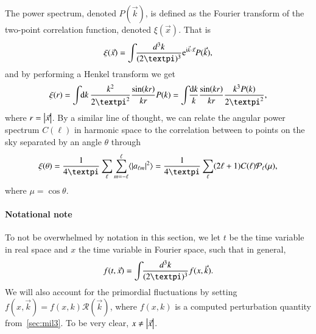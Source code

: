




The power spectrum, denoted $P(\vec{k})$, is defined as the Fourier transform of the two-point correlation function, denoted $\xi(\vec{x})$. That is
\begin{equation}
    \xi(\vec{x}) = \int \dkkk  \eu[\im \vec{k}\cdot \vec{x}] P(\vec{k}),
\end{equation}
and by performing a Henkel transform we get
\begin{equation}
    \xi(r) = \int\dx{k}\frac{k^2}{2\pi^2} \frac{\sin(kr)}{kr} P(k) = \int\!\!\frac{\diff k}{k} \frac{\sin(kr)}{kr} \frac{k^3P(k)}{2\pi^2},
\end{equation}
where $r=\abs{\vec{x}}$. By a similar line of thought, we can relate the angular power spectrum $C(\ell)$ in harmonic space to the correlation between to points on the sky separated by an angle $\theta$ through
\begin{equation}
    \xi(\theta) =\frac{1}{4\pi}  \sum_{\ell} \sum_{m= -\ell}^{\ell} \avg{\abs{a\ellm}^2}=\frac{1}{4\pi} \sum_{\ell} (2\ell + 1) C(\ell)\mathcal{P}_\ell(\mu),
\end{equation}
where $\mu = \cos{\theta}$.


\paragraph{Notational note} 
To not be overwhelmed by notation in this section, we let $t$ be the time variable in real space and $x$ the time variable in Fourier space, such that in general,
\begin{equation}
    f(t, \vec{x}) = \int \dkkk f(x, \vec{k}).
\end{equation}
We will also account for the primordial fluctuations by setting $f(x,\vec{k})= f(x, k) \mathcal{R}(\vec{k})$, where $f(x,k)$ is a computed perturbation quantity from~\cref{sec:mil3}. To be very clear, $x\neq \abs{\vec{x}}$.








